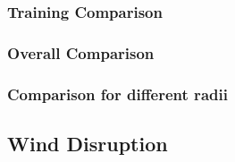 \subsubsection{Training Comparison}

\subsubsection{Overall Comparison}

\subsubsection{Comparison for different radii}

\newpage

\subsection{Wind Disruption}


